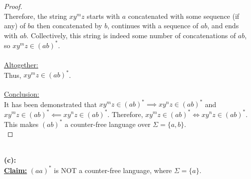 \documentclass[12pt]{article}
\begin{document}
\begin{proof}
    \\
    Therefore, the string $xy^mz$ starts with $a$ concatenated with some sequence (if any) of $ba$ then concatenated by $b$, continues with a sequence of $ab$, and ends with $ab$. Collectively, this string is indeed some number of concatenations of $ab$, so $xy^mz \in (ab)^*$. \\
    \\
    \underline{Altogether:} \\
    Thus, $xy^mz \in (ab)^*$. \\
    \\
    \underline{Conclusion:} \\
    It has been demonstrated that $xy^mz \in (ab)^* \implies xy^nz \in (ab)^*$ and $xy^mz \in (ab)^* \impliedby xy^nz \in (ab)^*$. Therefore, $xy^mz \in (ab)^* \iff xy^nz \in (ab)^*$. This makes $(ab)^*$ a counter-free language over $\Sigma = \{a, b\}$. \\
\end{proof}
\leavevmode\\
\textbf{(c):} \\
\textbf{\underline{Claim:}} $(aa)^*$ is NOT a counter-free language, where $\Sigma = \{ a \}$.
\end{document}

